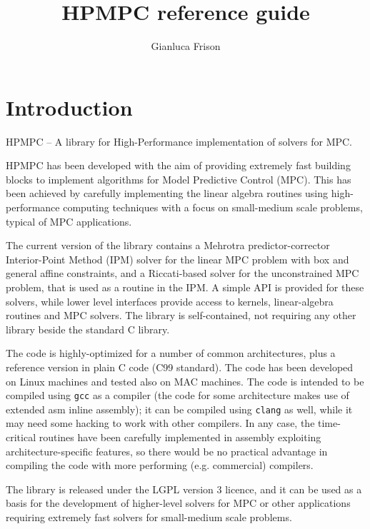 \documentclass[a4paper]{report}
\title{HPMPC reference guide}
\author{Gianluca Frison}
\begin{document}
\maketitle
\tableofcontents

\chapter{Introduction}

HPMPC -- A library for High-Performance implementation of solvers for MPC.

HPMPC has been developed with the aim of providing extremely fast building blocks to implement algorithms for Model Predictive Control (MPC). 
This has been achieved by carefully implementing the linear algebra routines using high-performance computing techniques with a focus on small-medium scale problems, typical of MPC applications.

The current version of the library contains a Mehrotra predictor-corrector Interior-Point Method (IPM) solver for the linear MPC problem with box and general affine constraints, and a Riccati-based solver for the unconstrained MPC problem, that is used as a routine in the IPM.
A simple API is provided for these solvers, while lower level interfaces provide access to kernels, linear-algebra routines and MPC solvers.
The library is self-contained, not requiring any other library beside the standard C library.

The code is highly-optimized for a number of common architectures, plus a reference version in plain C code (C99 standard).
The code has been developed on Linux machines and tested also on MAC machines. 
The code is intended to be compiled using {\tt gcc} as a compiler (the code for some architecture makes use of extended asm inline assembly); it can be compiled using {\tt clang} as well, while it may need some hacking to work with other compilers.
In any case, the time-critical routines have been carefully implemented in assembly exploiting architecture-specific features, so there would be no practical advantage in compiling the code with more performing (e.g. commercial) compilers.

The library is released under the LGPL version 3 licence, and it can be used as a basis for the development of higher-level solvers for MPC or other applications requiring extremely fast solvers for small-medium scale problems.
\end{document}
